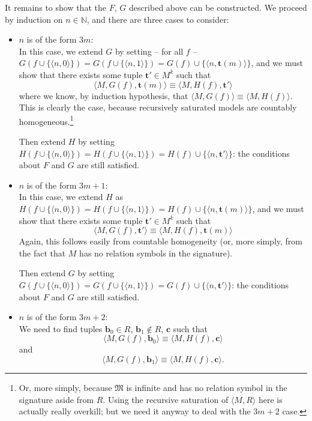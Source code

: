 \documentclass{article}
\theoremstyle{definition}
\newcommand{\tuple}{\mathbf}
\newcommand{\M}{\mathfrak M}
\begin{document}
	It remains to show that the $F$, $G$ described above can be constructed. We proceed by induction on $n \in \mathbb N$, and there are three cases to consider: 
	\begin{itemize}
		\item $n$ is of the form $3m$:\\

			In this case, we extend $G$ by setting -- for all $f$ -- $G(f \cup \{\langle n, 0\rangle\}) = G(f \cup \{\langle n, 1\rangle \}) = G(f) \cup \{\langle n, \tuple t(m)\rangle\}$, and we must show that there exists some tuple $\tuple t' \in M^k$ such that 
			\[
				\langle M, G(f), \tuple t(m)\rangle \equiv \langle M, H(f), \tuple t'\rangle
			\]
			where we know, by induction hypothesis, that $\langle M, G(f)\rangle \equiv \langle M, H(f)\rangle$. This is clearly the case, because recursively saturated models are countably homogeneous.\footnote{Or, more simply, because $\M$ is infinite and has no relation symbol in the signature aside from $R$.  Using the recursive saturation of $\langle M, R\rangle$ here is actually really overkill; but we need it anyway to deal with the $3m+2$ case.}

			Then extend $H$ by setting $H(f \cup \{\langle n,0\rangle\}) = H(f \cup \{\langle n, 1\rangle\}) = H(f) \cup \{\langle n, \tuple t'\rangle\}$: the conditions about $F$ and $G$ are still satisfied. 
		\item $n$ is of the form $3m+1$:\\

			In this case, we extend $H$ as $H(f \cup \{\langle n, 0\rangle\}) = H(f \cup \{\langle n, 1\rangle \}) = H(f) \cup \{\langle n, \tuple t(m)\rangle\}$, and we must show that there exists some tuple $\tuple t' \in M^k$ such that 
			\[
				\langle M, G(f), \tuple t'\rangle \equiv \langle M, H(f), \tuple t(m)\rangle
			\]
			Again, this follows easily from countable homogeneity (or, more simply, from the fact that $M$ has no relation symbols in the signature).

			
			Then extend $G$ by setting $G(f \cup \{\langle n,0\rangle\}) = G(f \cup \{\langle n, 1\rangle\}) = G(f) \cup \{\langle n, \tuple t'\rangle\}$: the conditions about $F$ and $G$ are still satisfied. 

		\item $n$ is of the form $3m+2$:\\
		
			We need to find tuples $\tuple b_0 \in R$, $\tuple b_1 \not \in R$, $\tuple c$ such that 
			\[
				\langle M, G(f), \tuple b_0\rangle \equiv \langle M, H(f), \tuple c\rangle
			\]
			and 
			\[
				\langle M, G(f), \tuple b_1\rangle \equiv \langle M, H(f), \tuple c\rangle. 
			\]
			

\end{itemize}
\end{document}
